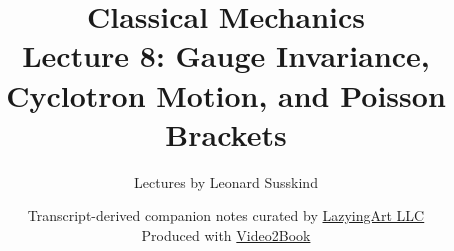\documentclass[11pt,oneside]{book}
\begin{document}
\hypersetup{pageanchor=false}
\frontmatter
\title{Classical Mechanics\\[0.45em]
\large Lecture 8: Gauge Invariance, Cyclotron Motion, and Poisson Brackets}
\author{Lectures by Leonard Susskind}
\date{Transcript-derived companion notes curated by
\href{https://lazying.art}{LazyingArt LLC}\\[0.35em]
\small Produced with
\href{https://github.com/lachlanchen/Video2Book}{Video2Book}}
\maketitle
\hypersetup{pageanchor=true}
\mainmatter

\end{document}
